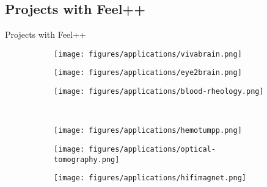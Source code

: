 \subsection{Projects with Feel++}
\begin{frame}{Projects with Feel++}
  \begin{figure}[H]
    \centering
    \begin{subfigure}[b]{.3\linewidth}
      \texttt{[image: figures/applications/vivabrain.png]}
    \end{subfigure}
    \begin{subfigure}[b]{.3\linewidth}
      \texttt{[image: figures/applications/eye2brain.png]}
    \end{subfigure}
    \begin{subfigure}[b]{.3\linewidth}
      \texttt{[image: figures/applications/blood-rheology.png]}
    \end{subfigure}\\
    \begin{subfigure}[b]{.3\linewidth}
      \texttt{[image: figures/applications/hemotumpp.png]}
    \end{subfigure}
    \begin{subfigure}[b]{.3\linewidth}
      \texttt{[image: figures/applications/optical-tomography.png]}
    \end{subfigure}
    \begin{subfigure}[b]{.3\linewidth}
      \texttt{[image: figures/applications/hifimagnet.png]}
    \end{subfigure}

  \end{figure}

\end{frame}


